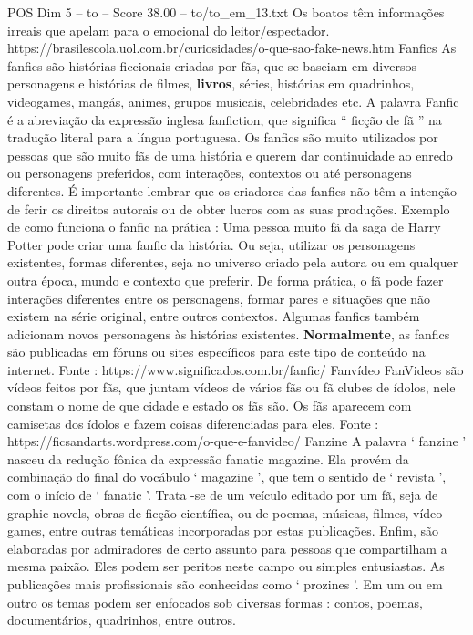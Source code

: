 \begin{textsample}{POS Dim 5 – to – Score 38.00 – to/to\_em\_13.txt}
Os boatos têm informações irreais que apelam para o emocional do leitor/espectador. https://brasilescola.uol.com.br/curiosidades/o-que-sao-fake-news.htm Fanfics As fanfics são histórias ficcionais criadas por fãs, que se baseiam em diversos personagens e histórias de filmes, \textbf{livros}, séries, histórias em quadrinhos, videogames, mangás, animes, grupos musicais, celebridades etc.
A palavra Fanfic é a abreviação da expressão inglesa fanfiction, que significa “ ficção de fã ” na tradução literal para a língua portuguesa.
Os fanfics são muito utilizados por pessoas que são muito fãs de uma história e querem dar continuidade ao enredo ou personagens preferidos, com interações, contextos ou até personagens diferentes.
É importante lembrar que os criadores das fanfics não têm a intenção de ferir os direitos autorais ou de obter lucros com as suas produções.
Exemplo de como funciona o fanfic na prática : Uma pessoa muito fã da saga de Harry Potter pode criar uma fanfic da história.
Ou seja, utilizar os personagens existentes, formas diferentes, seja no universo criado pela autora ou em qualquer outra época, mundo e contexto que preferir.
De forma prática, o fã pode fazer interações diferentes entre os personagens, formar pares e situações que não existem na série original, entre outros contextos.
Algumas fanfics também adicionam novos personagens às histórias existentes. \textbf{Normalmente}, as fanfics são publicadas em fóruns ou sites específicos para este tipo de conteúdo na internet.
Fonte : https://www.significados.com.br/fanfic/ Fanvídeo FanVideos são vídeos feitos por fãs, que juntam vídeos de vários fãs ou fã clubes de ídolos, nele constam o nome de que cidade e estado os fãs são.
Os fãs aparecem com camisetas dos ídolos e fazem coisas diferenciadas para eles.
Fonte : https://ficsandarts.wordpress.com/o-que-e-fanvideo/ Fanzine A palavra ‘ fanzine ’ nasceu da redução fônica da expressão fanatic magazine.
Ela provém da combinação do final do vocábulo ‘ magazine ’, que tem o sentido de ‘ revista ’, com o início de ‘ fanatic ’.
Trata -se de um veículo editado por um fã, seja de graphic novels, obras de ficção científica, ou de poemas, músicas, filmes, vídeo-games, entre outras temáticas incorporadas por estas publicações.
Enfim, são elaboradas por admiradores de certo assunto para pessoas que compartilham a mesma paixão.
Eles podem ser peritos neste campo ou simples entusiastas.
As publicações mais profissionais são conhecidas como ‘ prozines ’.
Em um ou em outro os temas podem ser enfocados sob diversas formas : contos, poemas, documentários, quadrinhos, entre outros.

\end{textsample}
